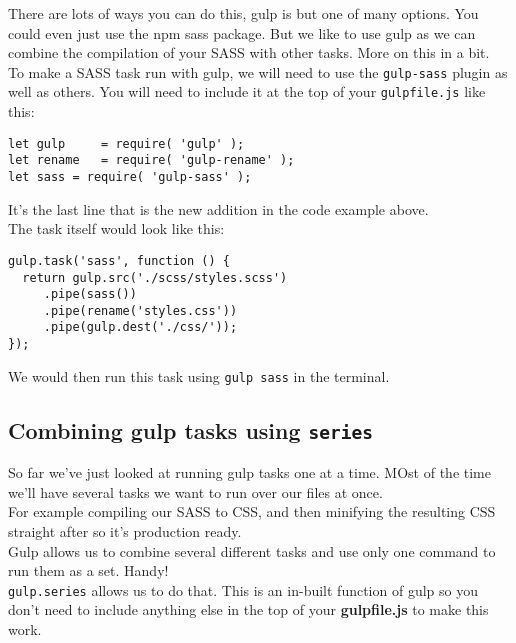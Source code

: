 There are lots of ways you can do this, gulp is but one of many options. You could even just use the npm sass package. But we like to use gulp as we can combine the compilation of your SASS with other tasks. More on this in a bit.
\\

To make a SASS task run with gulp, we will need to use the \texttt{gulp-sass} plugin as well as others. You will need to include it at the top of your \texttt{gulpfile.js} like this:
\\

	\begin{verbatim}
let gulp     = require( 'gulp' );
let rename   = require( 'gulp-rename' );
let sass = require( 'gulp-sass' );
	\end{verbatim}

It's the last line that is the new addition in the code example above.
\\

The task itself would look like this:
\\

	\begin{verbatim}
gulp.task('sass', function () {
  return gulp.src('./scss/styles.scss')
     .pipe(sass())
     .pipe(rename('styles.css'))
     .pipe(gulp.dest('./css/'));
});
	\end{verbatim}

We would then run this task using \texttt{gulp sass} in the terminal.



\subsection{Combining gulp tasks using \texttt{series}}

So far we've just looked at running gulp tasks one at a time. MOst of the time we'll have several tasks we want to run over our files at once.
\\

For example compiling our SASS to CSS, and then minifying the resulting CSS straight after so it's production ready.
\\

Gulp allows us to combine several different tasks and use only one command to run them as a set. Handy!
\\

\texttt{gulp.series} allows us to do that. This is an in-built function of gulp so you don't need to include anything else in the top of your \textbf{gulpfile.js} to make this work.
\\

